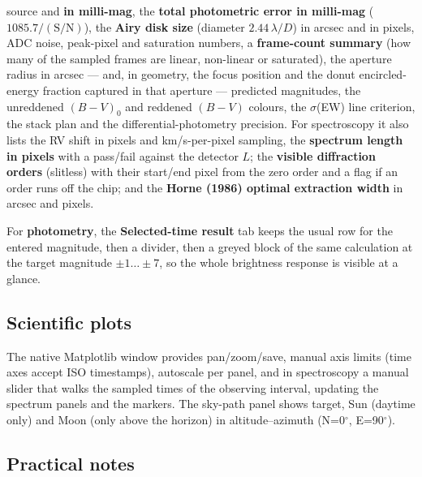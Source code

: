 \begin{itemize}
        source and \textbf{in milli-mag}, the \textbf{total photometric
        error in milli-mag} ($1085.7 / (\text{S/N})$), the \textbf{Airy
        disk size} (diameter $2.44\,\lambda/D$) in arcsec and in pixels,
        ADC noise, peak-pixel and saturation numbers, a
        \textbf{frame-count summary} (how many of the sampled frames are
        linear, non-linear or saturated), the aperture radius in arcsec ---
        and, in  geometry, the focus position and the donut
        encircled-energy fraction captured in that aperture --- predicted
        magnitudes, the unreddened $(B-V)_0$ and reddened $(B-V)$ colours,
        the $\sigma$(EW) line criterion, the stack plan and the
        differential-photometry precision. For spectroscopy it also lists
        the RV shift in pixels and km/s-per-pixel sampling, the
        \textbf{spectrum length in pixels} with a pass/fail against the
        detector $L$; the \textbf{visible diffraction orders} (slitless)
        with their start/end pixel from the zero order and a flag if an
        order runs off the chip; and the \textbf{Horne (1986) optimal
        extraction width} in arcsec and pixels.
\end{itemize}

For \textbf{photometry}, the \textbf{Selected-time result} tab keeps the
usual row for the entered magnitude, then a divider, then a greyed block of
the same calculation at the target magnitude $\pm1\ldots\pm7$, so the whole
brightness response is visible at a glance.

\subsection{Scientific plots}

The native Matplotlib window provides pan/zoom/save, manual axis limits
(time axes accept ISO timestamps), autoscale per panel, and in
spectroscopy a manual slider that walks the sampled times of the observing
interval, updating the spectrum panels and the markers. The sky-path panel
shows target, Sun (daytime only) and Moon (only above the horizon) in
altitude--azimuth (N=0$^\circ$, E=90$^\circ$).

\subsection{Practical notes}

